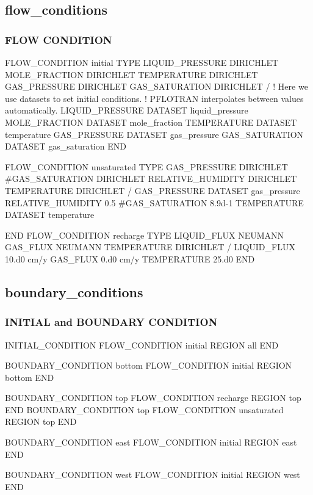 \documentclass{beamer}
\newcommand\bluecomment[1]{{{\color{blue} #1}}}
\begin{document}
\subsection{flow\_conditions}

\begin{frame}\frametitle{FLOW CONDITION}

\begin{semiverbatim}
FLOW_CONDITION initial
  TYPE
    LIQUID_PRESSURE DIRICHLET
    MOLE_FRACTION DIRICHLET
    TEMPERATURE DIRICHLET
    GAS_PRESSURE DIRICHLET
    GAS_SATURATION DIRICHLET
  / \bluecomment{! Here we use datasets to set initial conditions.} 
    \bluecomment{! PFLOTRAN interpolates between values automatically.}
  LIQUID_PRESSURE DATASET liquid_pressure 
  MOLE_FRACTION DATASET mole_fraction
  TEMPERATURE DATASET temperature
  GAS_PRESSURE DATASET gas_pressure
  GAS_SATURATION DATASET gas_saturation
END



FLOW_CONDITION unsaturated
  TYPE
    GAS_PRESSURE DIRICHLET
    #GAS_SATURATION DIRICHLET
    RELATIVE_HUMIDITY DIRICHLET
    TEMPERATURE DIRICHLET
  /
  GAS_PRESSURE DATASET gas_pressure 
  RELATIVE_HUMIDITY 0.5
  #GAS_SATURATION 8.9d-1 
  TEMPERATURE DATASET temperature 

END
\newpage
FLOW_CONDITION recharge
  TYPE
    LIQUID_FLUX NEUMANN
    GAS_FLUX NEUMANN
    TEMPERATURE DIRICHLET
  /
  LIQUID_FLUX 10.d0 cm/y 
  GAS_FLUX 0.d0 cm/y
  TEMPERATURE 25.d0
END
\end{semiverbatim}

\end{frame}
\subsection{boundary_conditions}

\begin{frame}\frametitle{INITIAL and BOUNDARY CONDITION}

\begin{semiverbatim}
INITIAL_CONDITION
  FLOW_CONDITION initial
  REGION all
END

BOUNDARY_CONDITION bottom
  FLOW_CONDITION initial
  REGION bottom
END

BOUNDARY_CONDITION top
  FLOW_CONDITION recharge
  REGION top
END
\newpage
BOUNDARY_CONDITION top
  FLOW_CONDITION unsaturated
  REGION top
END

BOUNDARY_CONDITION east
  FLOW_CONDITION initial
  REGION east
END

BOUNDARY_CONDITION west
  FLOW_CONDITION initial
  REGION west
END
\end{semiverbatim}

\end{frame}
\end{document}
